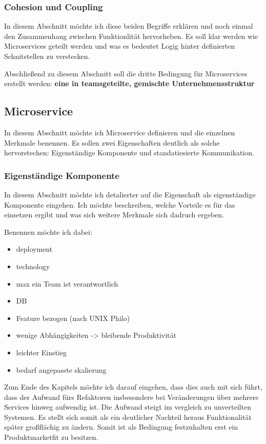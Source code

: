 \subsubsection{Cohesion und Coupling}

In diesem Abschnitt möchte ich diese beiden Begriffe erklären und noch einmal den Zusammenhang zwischen Funktionlität hervorheben. Es soll klar werden wie Microservices geteilt werden und was es bedeutet Logig hinter definierten Schnitstellen zu verstecken.

Abschließend zu diesem Abschnitt soll die dritte Bedingung für Microservices erstellt werden: \textbf{eine in teamsgeteilte, gemischte Unternehmensstruktur}

\subsection{Microservice}

In diesem Abschnitt möchte ich Microservice definieren und die einzelnen Merkmale benennen.
Es sollen zwei Eigenschaften deutlich als solche hervorstechen: Eigenständige Komponente und standatiesierte Kommunikation.

\subsubsection{Eigenständige Komponente}

In diesem Abschnitt möchte ich detalierter auf die Eigenschaft als eigenständige Komponente eingehen. Ich möchte beschreiben, welche Vorteile es für das einsetzen ergibt und was sich weitere Merkmale sich dadruch ergeben.

Benennen möchte ich dabei:
\begin{itemize}
	\item deployment
	\item technology
	\item max ein Team ist verantwortlich
	\item DB
	\item Feature bezogen (nach UNIX Philo)
	\item wenige Abhängigkeiten -> bleibende Produktivität
	\item leichter Einstieg
	\item bedarf angepasste skalierung
\end{itemize}

Zum Ende des Kapitels möchte ich darauf eingehen, dass dies auch mit sich führt, dass der Aufwand fürs Refaktoren insbesondere bei Veränderungen über mehrere Services hinweg aufwendig ist. Die Aufwand steigt im vergleich zu unverteilten Systemen. Es stellt sich somit als ein deutlicher Nachteil heraus Funktionalität später großflächig zu ändern.
Somit ist als Bedingung festzuhalten erst ein Produktmarketfit zu besitzen.

